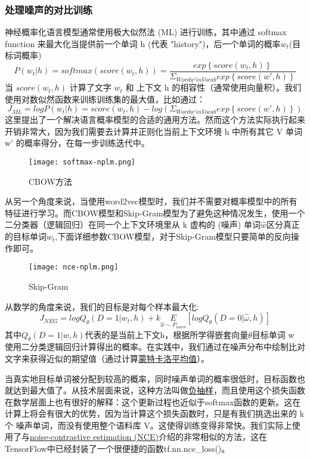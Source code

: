 \subsubsection{处理噪声的对比训练}
神经概率化语言模型通常使用极大似然法 (ML) 进行训练，其中通过 softmax function 来最大化当提供前一个单词 h (代表 "history")，后一个单词的概率$w_t$(目标词概率)
\begin{equation*}
P(w_t|h)=softmax(score(w_t,h))=\frac{exp\left\{score(w_t,h)\right\}}{\Sigma_{Word w' in Vocab}exp\left\{score(w',h)\right\}}
\end{equation*}
当 $score(w_t,h)$ 计算了文字 $w_t$ 和 上下文 h 的相容性（通常使用向量积）。我们使用对数似然函数来训练训练集的最大值，比如通过：
\begin{equation*}
J_{ML} = logP(w_t|h)=score(w_t,h)-log(\Sigma_{Word w' in Vocab}exp\left\{score(w',h)\right\})
\end{equation*}
这里提出了一个解决语言概率模型的合适的通用方法。然而这个方法实际执行起来开销非常大，因为我们需要去计算并正则化当前上下文环境 h 中所有其它 V 单词 w' 的概率得分，在每一步训练迭代中。
\begin{figure}[H]
\texttt{[image: softmax-nplm.png]}
\caption{CBOW方法}
\end{figure}
从另一个角度来说，当使用word2vec模型时，我们并不需要对概率模型中的所有特征进行学习。而CBOW模型和Skip-Gram模型为了避免这种情况发生，使用一个二分类器（逻辑回归）在同一个上下文环境里从 k 虚构的 (噪声) 单词$\hat{w}$区分真正的目标单词$w_t$,下面详细参数CBOW模型，对于Skip-Gram模型只要简单的反向操作即可。
\begin{center}
\begin{figure}[H]
\texttt{[image: nce-nplm.png]}
\caption{Skip-Gram}
\end{figure}
\end{center}
从数学的角度来说，我们的目标是对每个样本最大化:
\begin{equation*}
J_{NEG}=logQ_{\theta}(D=1|w_t,h)+k\underset{\hat{w}\sim P_{noise}}{E}[logQ_{\theta}(D=0|\hat{\omega},h)]
\end{equation*}
其中$Q_{\theta}(D=1|w,h)$代表的是当前上下文h，根据所学得嵌套向量$\theta$目标单词 w 使用二分类逻辑回归计算得出的概率。在实践中，我们通过在噪声分布中绘制比对文字来获得近似的期望值（通过计算\href{https://en.wikipedia.org/wiki/Monte_Carlo_integration}{蒙特卡洛平均值}）。

当真实地目标单词被分配到较高的概率，同时噪声单词的概率很低时，目标函数也就达到最大值了。从技术层面来说，这种方法叫做\href{http://papers.nips.cc/paper/5021-distributed-representations-of-words-and-phrases-and-their-compositionality.pdf}{负抽样}，而且使用这个损失函数在数学层面上也有很好的解释：这个更新过程也近似于softmax函数的更新。这在计算上将会有很大的优势，因为当计算这个损失函数时，只是有我们挑选出来的 k 个 噪声单词，而没有使用整个语料库 V。这使得训练变得非常快。我们实际上使用了与\href{http://papers.nips.cc/paper/5165-learning-word-embeddings-efficiently-with-noise-contrastive-estimation.pdf}{noise-contrastive estimation (NCE)}介绍的非常相似的方法，这在TensorFlow中已经封装了一个很便捷的函数tf.nn.nce\_loss()。

